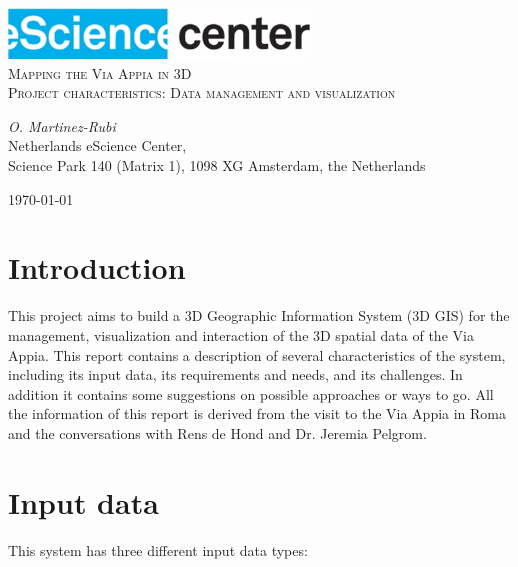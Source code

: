 \documentclass[a4paper,11pt]{article}
\begin{document}
\begin{titlepage}
\begin{center}
\includegraphics[width=0.6\textwidth]{fig/logo}\\[3cm]    
\textsc{\LARGE Mapping the Via Appia in 3D}\\[0.5cm]
\textsc{\large Project characteristics: Data management and visualization}\\[0.5cm]
\vfill
\end{center}
{\large
\emph{O. Martinez-Rubi } \\
}
{\large
{Netherlands eScience Center, \\
Science Park 140 (Matrix 1), 1098 XG Amsterdam, the Netherlands\\
}
}
\begin{center}
{\large \today}
\end{center}
\end{titlepage}



\section{Introduction}

This project aims to build a 3D Geographic Information System (3D GIS) for the management, visualization and interaction of the 3D spatial data of the Via Appia. This report contains a description of several characteristics of the system, including its input data, its requirements and needs, and its challenges. In addition it contains some suggestions on possible approaches or ways to go. All the information of this report is derived from the visit to the Via Appia in Roma and the conversations with Rens de Hond and Dr. Jeremia Pelgrom. 

\section{Input data}

This system has three different input data types:
\end{document}
